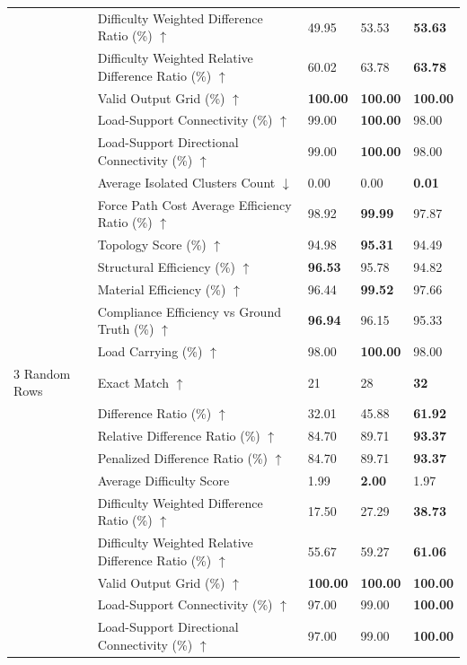 \begin{table}[!h]
{\begin{tabular}{lllll}
 & Difficulty Weighted Difference Ratio (\%) $\uparrow$ & 49.95 & 53.53 & \textbf{53.63} \\
 & Difficulty Weighted Relative Difference Ratio (\%) $\uparrow$ & 60.02 & 63.78 & \textbf{63.78} \\
 & Valid Output Grid (\%) $\uparrow$ & \textbf{100.00} & \textbf{100.00} & \textbf{100.00} \\
 & Load-Support Connectivity (\%) $\uparrow$ & 99.00 & \textbf{100.00} & 98.00 \\
 & Load-Support Directional Connectivity (\%) $\uparrow$ & 99.00 & \textbf{100.00} & 98.00 \\
 & Average Isolated Clusters Count $\downarrow$ & 0.00 & 0.00 & \textbf{0.01} \\
 & Force Path Cost Average Efficiency Ratio (\%) $\uparrow$ & 98.92 & \textbf{99.99} & 97.87 \\
 & Topology Score (\%) $\uparrow$ & 94.98 & \textbf{95.31} & 94.49 \\
 & Structural Efficiency (\%) $\uparrow$ & \textbf{96.53} & 95.78 & 94.82 \\
 & Material Efficiency (\%) $\uparrow$ & 96.44 & \textbf{99.52} & 97.66 \\
 & Compliance Efficiency vs Ground Truth (\%) $\uparrow$ & \textbf{96.94} & 96.15 & 95.33 \\
 & Load Carrying (\%) $\uparrow$ & 98.00 & \textbf{100.00} & 98.00 \\
3 Random Rows & Exact Match $\uparrow$ & 21 & 28 & \textbf{32} \\
 & Difference Ratio (\%) $\uparrow$ & 32.01 & 45.88 & \textbf{61.92} \\
 & Relative Difference Ratio (\%) $\uparrow$ & 84.70 & 89.71 & \textbf{93.37} \\
 & Penalized Difference Ratio (\%) $\uparrow$ & 84.70 & 89.71 & \textbf{93.37} \\
 & Average Difficulty Score & 1.99 & \textbf{2.00} & 1.97 \\
 & Difficulty Weighted Difference Ratio (\%) $\uparrow$ & 17.50 & 27.29 & \textbf{38.73} \\
 & Difficulty Weighted Relative Difference Ratio (\%) $\uparrow$ & 55.67 & 59.27 & \textbf{61.06} \\
 & Valid Output Grid (\%) $\uparrow$ & \textbf{100.00} & \textbf{100.00} & \textbf{100.00} \\
 & Load-Support Connectivity (\%) $\uparrow$ & 97.00 & 99.00 & \textbf{100.00} \\
 & Load-Support Directional Connectivity (\%) $\uparrow$ & 97.00 & 99.00 & \textbf{100.00} \\

\end{tabular}}
\end{table}
